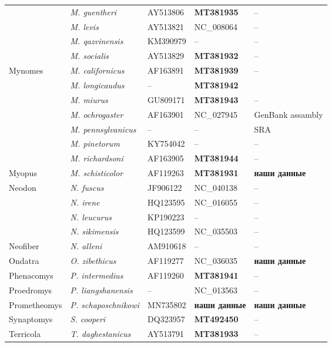 \begin{landscape}
\begin{center}
\begin{longtable}{|p{3.5cm}|p{4.5cm}|p{4.0cm}|p{6.5cm}|p{4.5cm}|}
& \textit{M. guentheri} & AY513806 & \textbf{MT381935} & --\\ \cline{2-5}
& \textit{M. levis} & AY513821 & NC\_008064 & --\\ \cline{2-5}
& \textit{M. qazvinensis} & KM390979 & -- & --\\ \cline{2-5}
& \textit{M. socialis} & AY513829 & \textbf{MT381932} & --\\ \hline
\multirow{7}{*}{Mynomes} & \textit{M. californicus} & AF163891 & \textbf{MT381939} & --\\ \cline{2-5}
& \textit{M. longicaudus} & -- & \textbf{MT381942} & \\ \cline{2-5}
& \textit{M. miurus} & GU809171 & \textbf{MT381943} & --\\ \cline{2-5}
& \textit{M. ochrogaster} & AF163901 & NC\_027945 & GenBank assambly\\ \cline{2-5}
& \textit{M. pennsylvanicus} & -- & -- & SRA\\ \cline{2-5}
& \textit{M. pinetorum} & KY754042 & -- & --\\ \cline{2-5}
& \textit{M. richardsoni} & AF163905 & \textbf{MT381944} & --\\ \cline{2-5}
Myopus & \textit{M. schisticolor} & AF119263 & \textbf{MT381931} & \textbf{наши данные}\\ \hline
\multirow{4}{*}{Neodon} & \textit{N. fuscus} & JF906122 & NC\_040138 & --\\ \cline{2-5}
& \textit{N. irene} & HQ123595 & NC\_016055 & --\\ \cline{2-5}
& \textit{N. leucurus} & KP190223 & -- & --\\ \cline{2-5}
& \textit{N. sikimensis} & HQ123599 & NC\_035503 & --\\ \hline
Neofiber & \textit{N. alleni} & AM910618 & -- & --\\ \hline
Ondatra & \textit{O. zibethicus} & AF119277 & NC\_036035 & \textbf{наши данные}\\ \hline
Phenacomys & \textit{P. intermedius} & AF119260 & \textbf{MT381941} & --\\ \hline
Proedromys & \textit{P. liangshanensis} & -- & NC\_013563 & --\\ \hline
Prometheomys & \textit{P. schaposchnikowi} & MN735802 & \textbf{наши данные} & \textbf{наши данные}\\ \hline
Synaptomys & \textit{S. cooperi} & DQ323957 & \textbf{MT492450} & --\\ \hline
\multirow{4}{*}{Terricola} & \textit{T. daghestanicus} & AY513791 & \textbf{MT381933} & --\\ \cline{2-5}

\end{longtable}
\end{center}
\end{landscape}
